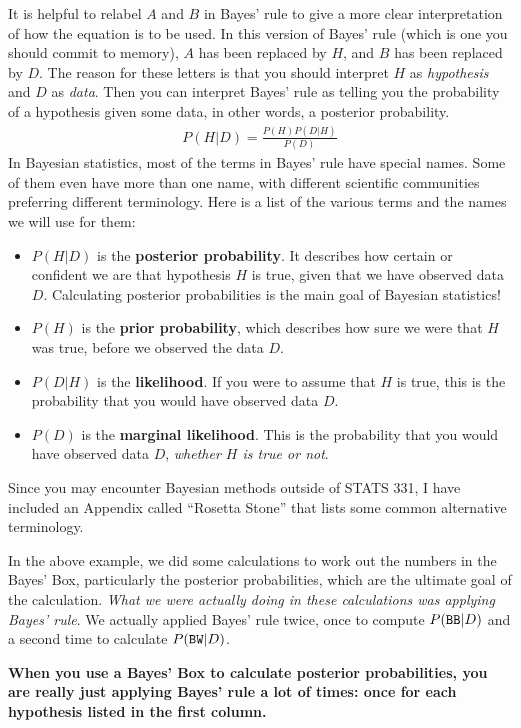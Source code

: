 It is helpful to relabel $A$ and $B$ in Bayes' rule to give a more clear
interpretation of how the equation is to be used. In this version of Bayes'
rule (which is one you should commit to memory), $A$ has been replaced by $H$,
and $B$ has been replaced by $D$. The reason for these letters is that you should
interpret $H$ as {\it hypothesis} and $D$ as {\it data}. Then you can interpret
Bayes' rule as telling you the probability of a hypothesis given some data, in
other words, a posterior probability.
\begin{eqnarray}
P(H|D) = \frac{P(H)P(D|H)}{P(D)}
\end{eqnarray}
In Bayesian statistics, most of the terms in Bayes' rule have special names.
Some of them even have more than one name, with different scientific
communities preferring different terminology. Here is a list of the
various terms and the names we will use for them:
\begin{itemize}
\item $P(H|D)$ is the {\bf posterior probability}. It describes how certain
or confident we are that
hypothesis $H$ is true, given that we have observed data $D$. Calculating
posterior probabilities is the main goal of Bayesian statistics!
\item $P(H)$ is the {\bf prior probability}, which describes how sure we were
that $H$ was true, before we observed the data $D$.
\item $P(D|H)$ is the {\bf likelihood}. If you were to assume that $H$ is true,
this is the probability that you would have observed data $D$.
\item $P(D)$ is the {\bf marginal likelihood}. This is the probability that you
would have observed data $D$, {\it whether $H$ is true or not}.
\end{itemize}
Since you may encounter Bayesian methods outside of STATS 331, I have included
an Appendix called ``Rosetta Stone'' that lists some common alternative
terminology.

In the above example, we did some calculations to work out the numbers in the
Bayes' Box, particularly the posterior probabilities, which are the ultimate
goal of the calculation. {\it What we were actually doing in these calculations
was applying Bayes' rule}. We actually applied Bayes' rule twice, once to
compute $P(\texttt{BB} | D)$ and a second time to calculate $P(\texttt{BW} | D)$.

\begin{framed}
{\bf When you use a Bayes' Box to calculate posterior probabilities,
you are really just applying Bayes' rule a lot of times:
once for each hypothesis listed in the first column.}
\end{framed}

